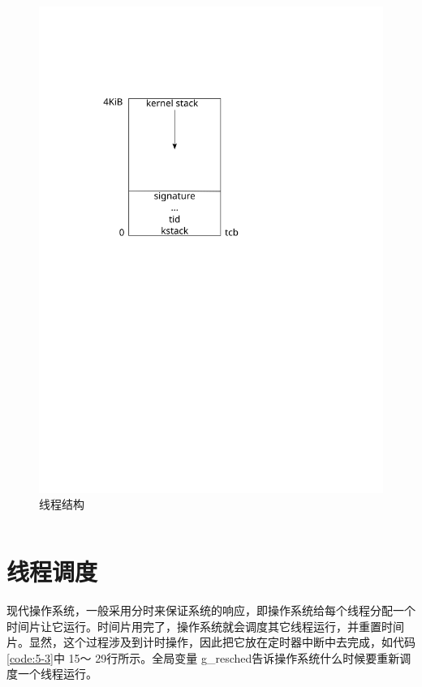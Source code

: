 \documentclass[main.tex]{subfiles}
\begin{document}
\begin{CJK*}{UTF8}{song}
\begin{figure}[htp]
\centering
\includegraphics[scale=0.4]{figures/5-1}
\caption{线程结构}
\label{figure:5-1}
\end{figure}

\begin{code}
\label{code:5-2}
\inputminted[firstline=163,lastline=203,linenos,numbersep=5pt,frame=lines,framesep=2mm]{c}{src/chapter05/kernel/task.c}
\end{code}

\section{线程调度}
现代操作系统，一般采用分时来保证系统的响应，即操作系统给每个线程分配一个时间片让它运行。时间片用完了，操作系统就会调度其它线程运行，并重置时间片。显然，这个过程涉及到计时操作，因此把它放在定时器中断中去完成，如代码\ref{code:5-3}中 15～ 29行所示。全局变量 g\_\-resched告诉操作系统什么时候要重新调度一个线程运行。


\end{CJK*}
\end{document}
